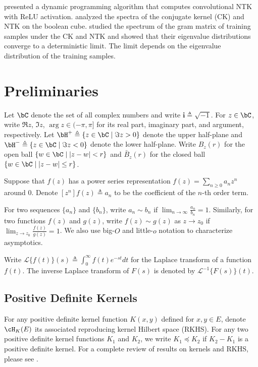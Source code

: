 \documentclass[11pt]{article}
\renewcommand{\i}{\mathbf{i}}
\newcommand{\la}{\mathscr{L}}
\begin{document}
\citet{arora2019exact} presented a dynamic programming algorithm that computes convolutional NTK with ReLU activation. \citet{yang2019fine} analyzed the spectra of the conjugate kernel (CK) and NTK on the boolean cube. 
\citet{fan2020spectra} studied the spectrum of the gram matrix of training samples under the CK and NTK and showed that their eigenvalue distributions converge to a deterministic limit. The limit depends on the eigenvalue distribution of the training samples. 



\section{Preliminaries}

Let $\bC$ denote the set of all complex numbers and write $\i\triangleq \sqrt{-1}$. For $z\in \bC$, write $\Re z$, $\Im z$, $\arg z\in (-\pi,\pi]$ for its real part, imaginary part, and argument, respectively. Let $\bH^+ \triangleq \{z\in \bC \mid \Im z>0\}$ denote the upper half-plane and $\bH^- \triangleq \{z\in \bC \mid \Im z<0\}$ denote the lower half-plane. Write $B_z(r)$ for the open ball $\{w\in \bC \mid  |z-w|<r\}$ and $\bar{B}_z(r)$ for the closed ball $\{w\in \bC \mid  |z-w|\leq r\}$.

Suppose that $f(z)$ has a power series representation $f(z)=\sum_{n\ge 0} a_n z^n$ around $0$. Denote $[z^n]f(z)\triangleq a_n$ to be the coefficient of the $n$-th order term. 

For two sequences $\{a_n\}$ and $\{b_n\}$, write $a_n\sim b_n$ if $\lim_{n\to \infty} \frac{a_n}{b_n} = 1$. Similarly, for two functions $f(z)$ and $g(z)$, write $f(z)\sim g(z)$ as $z\to z_0$ if $\lim_{z\to z_0} \frac{f(z)}{g(z)}=1$. We also use big-$O$ and little-$o$ notation to characterize asymptotics.  

Write $\la\{f(t)\}(s) \triangleq \int_0^\infty f(t)e^{-st}dt$ for the Laplace transform of a function $f(t)$. The inverse Laplace transform of $F(s)$ is denoted by $\la^{-1}\{F(s)\}(t)$. 


\subsection{Positive Definite Kernels}
For any positive definite kernel function $K(x,y)$ defined for $x,y\in E$, denote $\cH_K(E)$ its associated reproducing kernel Hilbert space (RKHS). For any two positive definite kernel functions $K_1$ and $K_2$, we write $K_1  \preccurlyeq K_2$ if $K_2-K_1$ is a positive definite kernel. For a complete review of results on kernels and RKHS, please see \citep{saitoh2016theory}.
\end{document}
